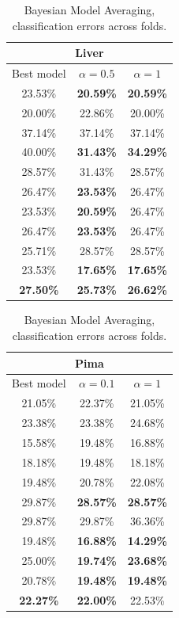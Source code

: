 \documentclass[a4paper,12pt ]{report}
\begin{document}
\begin{table}[h]

\caption{{ Bayesian Model Averaging, classification errors across folds.  }}

\label{tbl:BMAliver}

\begin{minipage}{0.55\textwidth}
      \centering
      \begin{tabular}{|c | c | c | }
      \hline
      \multicolumn{3}{|c|}{Liver}  \\
      \hline
      Best model & $ \alpha = 0.5 $ & $ \alpha = 1 $ \\  \hline
      23.53\% & \textbf{20.59\%} & \textbf{20.59\% } \\ 
      20.00\%	& 22.86\% &20.00\% \\ 
      37.14\%	& 37.14\% &37.14\%\\ 
      40.00\%	& \textbf{31.43\%} & \textbf{34.29\%}  \\ 
      28.57\%	& 31.43\% & 28.57\% \\ 
      26.47\%	& \textbf{23.53\%} & 26.47\% \\ 
      23.53\%	& \textbf{20.59\%} &26.47\%\\ 
      26.47\%	& \textbf{23.53\%} &26.47\%\\ 
      25.71\%	& 28.57\% &28.57\% \\ 
      23.53\%	& \textbf{17.65\%} & \textbf{17.65\%} \\ \hline \hline
       \textbf{27.50\%}	&  \textbf{25.73\%} &  \textbf{26.62\%} \\ 
      \hline 
      \end{tabular}

\end{minipage}%
\begin{minipage}{0.55\textwidth}
      \centering
          \begin{tabular}{|c | c | c | }
      \hline
      \multicolumn{3}{|c|}{Pima}  \\
      \hline
      Best model & $ \alpha = 0.1 $ & $ \alpha = 1 $ \\  \hline
      21.05\% & 	{22.37\%} & 	{21.05\%}   \\
      23.38\% & 	{23.38\%} & 	{24.68\%}  \\
      15.58\% & 	{19.48\%} & 	{16.88\%}  \\
      18.18\% & 	{19.48\%} & 	{18.18\%}  \\
      19.48\% & 	{20.78\%} & 	{22.08\%}  \\
      29.87\% & 	\textbf{28.57\%} & 	\textbf{28.57\%}  \\
      29.87\% & 	{29.87\%} & 	{36.36\%}  \\
      19.48\% & 	\textbf{16.88\%} & 	\textbf{14.29\%}  \\
      25.00\% & 	\textbf{19.74\%} & 	\textbf{23.68\%}  \\
      20.78\% & 	\textbf{19.48\%} & 	\textbf{19.48\%}  \\ \hline \hline
       \textbf{22.27\%} & 	 \textbf{22.00\%} & 	 {22.53\%} \\


\end{tabular}
\end{minipage}
\end{table}
\end{document}
